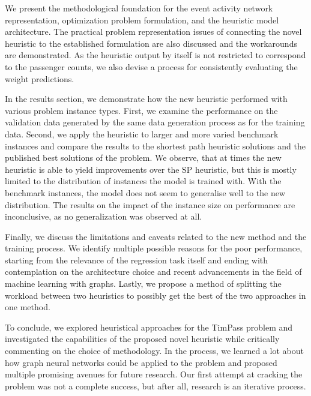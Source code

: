 \documentclass[english, 12pt, a4paper, sci, utf8, a-2b, online]{aaltothesis}
\begin{document}
We present the methodological foundation for the event activity network representation, optimization problem formulation, and the heuristic model architecture. The practical problem representation issues of connecting the novel heuristic to the established formulation are also discussed and the workarounds are demonstrated. As the heuristic output by itself is not restricted to correspond to the passenger counts, we also devise a process for consistently evaluating the weight predictions.

In the results section, we demonstrate how the new heuristic performed with various problem instance types. First, we examine the performance on the validation data generated by the same data generation process as for the training data. Second, we apply the heuristic to larger and more varied benchmark instances and compare the results to the shortest path heuristic solutions and the published best solutions of the problem. We observe, that at times the new heuristic is able to yield improvements over the SP heuristic, but this is mostly limited to the distribution of instances the model is trained with. With the benchmark instances, the model does not seem to generalise well to the new distribution. The results on the impact of the instance size on performance are inconclusive, as no generalization was observed at all.

Finally, we discuss the limitations and caveats related to the new method and the training process. We identify multiple possible reasons for the poor performance, starting from the relevance of the regression task itself and ending with contemplation on the architecture choice and recent advancements in the field of machine learning with graphs. Lastly, we propose a method of splitting the workload between two heuristics to possibly get the best of the two approaches in one method.

To conclude, we explored heuristical approaches for the TimPass problem and investigated the capabilities of the proposed novel heuristic while critically commenting on the choice of methodology. In the process, we learned a lot about how graph neural networks could be applied to the problem and proposed multiple promising avenues for future research. Our first attempt at cracking the problem was not a complete success, but after all, research is an iterative process.

\clearpage
\thesisbibliography

 
%  

\end{document}
